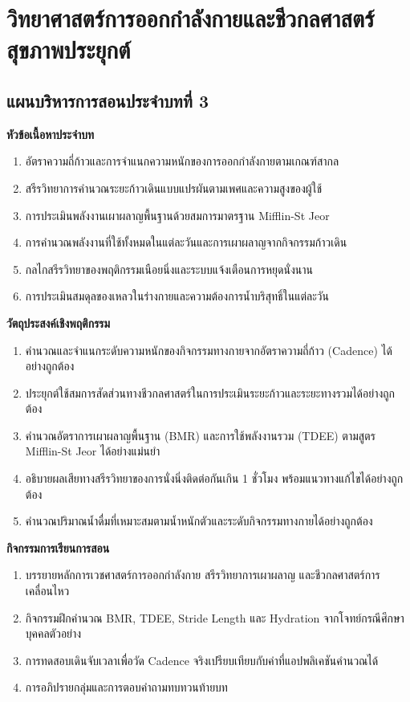 \chapter{วิทยาศาสตร์การออกกำลังกายและชีวกลศาสตร์สุขภาพประยุกต์}
\label{chap:ch03}

\section*{แผนบริหารการสอนประจำบทที่ 3}

\noindent\textbf{หัวข้อเนื้อหาประจำบท}
\begin{enumerate}
    \item อัตราความถี่ก้าวและการจำแนกความหนักของการออกกำลังกายตามเกณฑ์สากล
    \item สรีรวิทยาการคำนวณระยะก้าวเดินแบบแปรผันตามเพศและความสูงของผู้ใช้
    \item การประเมินพลังงานเผาผลาญพื้นฐานด้วยสมการมาตรฐาน Mifflin-St Jeor
    \item การคำนวณพลังงานที่ใช้ทั้งหมดในแต่ละวันและการเผาผลาญจากกิจกรรมก้าวเดิน
    \item กลไกสรีรวิทยาของพฤติกรรมเนือยนิ่งและระบบแจ้งเตือนการหยุดนั่งนาน
    \item การประเมินสมดุลของเหลวในร่างกายและความต้องการน้ำบริสุทธิ์ในแต่ละวัน
\end{enumerate}

\noindent\textbf{วัตถุประสงค์เชิงพฤติกรรม}
\begin{enumerate}
    \item คำนวณและจำแนกระดับความหนักของกิจกรรมทางกายจากอัตราความถี่ก้าว (Cadence) ได้อย่างถูกต้อง
    \item ประยุกต์ใช้สมการสัดส่วนทางชีวกลศาสตร์ในการประเมินระยะก้าวและระยะทางรวมได้อย่างถูกต้อง
    \item คำนวณอัตราการเผาผลาญพื้นฐาน (BMR) และการใช้พลังงานรวม (TDEE) ตามสูตร Mifflin-St Jeor ได้อย่างแม่นยำ
    \item อธิบายผลเสียทางสรีรวิทยาของการนั่งนิ่งติดต่อกันเกิน 1 ชั่วโมง พร้อมแนวทางแก้ไขได้อย่างถูกต้อง
    \item คำนวณปริมาณน้ำดื่มที่เหมาะสมตามน้ำหนักตัวและระดับกิจกรรมทางกายได้อย่างถูกต้อง
\end{enumerate}

\noindent\textbf{กิจกรรมการเรียนการสอน}
\begin{enumerate}
    \item บรรยายหลักการเวชศาสตร์การออกกำลังกาย สรีรวิทยาการเผาผลาญ และชีวกลศาสตร์การเคลื่อนไหว
    \item กิจกรรมฝึกคำนวณ BMR, TDEE, Stride Length และ Hydration จากโจทย์กรณีศึกษาบุคคลตัวอย่าง
    \item การทดสอบเดินจับเวลาเพื่อวัด Cadence จริงเปรียบเทียบกับค่าที่แอปพลิเคชันคำนวณได้
    \item การอภิปรายกลุ่มและการตอบคำถามทบทวนท้ายบท
\end{enumerate}

